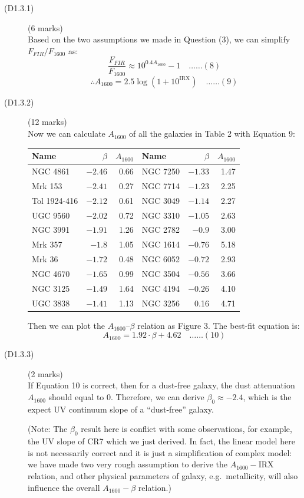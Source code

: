 \begin{description}
\item[(D1.3.1)] \hfill(6 marks)\\
  Based on the two assumptions we made in Question (3), we can simplify
  $F_{FIR}/F_{1600}$ as:
  \[ \frac{F_{FIR}}{F_{1600}} \approx 10^{0.4 A_{1600}} - 1
     \quad\ldots\ldots(8) \]
  \[ \therefore A_{1600} = 2.5\log\left(1 + 10^{\mathrm{IRX}}\right)
     \quad\ldots\ldots(9) \]

\item[(D1.3.2)] \hfill(12 marks)\\
  Now we can calculate $A_{1600}$ of all the galaxies in Table 2 with
  Equation 9:

  \begin{center}
  \begin{tabular}{lrr|lrr}
    Name & $\beta$ & $A_{1600}$ & Name & $\beta$ & $A_{1600}$ \\
    \hline
    NGC 4861     & $-2.46$ & 0.66 & NGC 7250 & $-1.33$ & 1.47 \\
    Mrk 153      & $-2.41$ & 0.27 & NGC 7714 & $-1.23$ & 2.25 \\
    Tol 1924-416 & $-2.12$ & 0.61 & NGC 3049 & $-1.14$ & 2.27 \\
    UGC 9560     & $-2.02$ & 0.72 & NGC 3310 & $-1.05$ & 2.63 \\
    NGC 3991     & $-1.91$ & 1.26 & NGC 2782 & $-0.9$  & 3.00 \\
    Mrk 357      & $-1.8$  & 1.05 & NGC 1614 & $-0.76$ & 5.18 \\
    Mrk 36       & $-1.72$ & 0.48 & NGC 6052 & $-0.72$ & 2.93 \\
    NGC 4670     & $-1.65$ & 0.99 & NGC 3504 & $-0.56$ & 3.66 \\
    NGC 3125     & $-1.49$ & 1.64 & NGC 4194 & $-0.26$ & 4.10 \\
    UGC 3838     & $-1.41$ & 1.13 & NGC 3256 & 0.16    & 4.71 \\
  \end{tabular}
  \end{center}

  Then we can plot the $A_{1600}$--$\beta$ relation as Figure 3. The best-fit
  equation is:
  \[ A_{1600} = 1.92\cdot\beta + 4.62 \quad\ldots\ldots(10) \]

\item[(D1.3.3)] \hfill(2 marks)\\
  If Equation 10 is correct, then for a dust-free galaxy, the dust
  attenuation $A_{1600}$ should equal to 0. Therefore, we can derive
  $\beta_0 \approx -2.4$, which is the expect UV continuum slope of a
  ``dust-free'' galaxy.

  (Note: The $\beta_0$ result here is conflict with some observations, for
  example, the UV slope of CR7 which we just derived. In fact, the linear
  model here is not necessarily correct and it is just a simplification of
  complex model: we have made two very rough assumption to derive the
  $A_{1600}-\mathrm{IRX}$ relation, and other physical parameters of galaxy,
  e.g.\ metallicity, will also influence the overall $A_{1600}-\beta$
  relation.)
\end{description}

